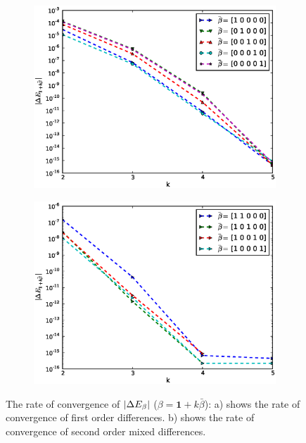 \documentclass[11pt]{article}
\begin{document}
	
	\begin{figure}[h!]
		\centering
		\begin{subfigure}{.5\textwidth}
			\centering
			\includegraphics[width=1\linewidth]{./figures/first_difference_basket.eps}
			\caption{}
			\label{fig:sub1}
		\end{subfigure}%
		\begin{subfigure}{.5\textwidth}
			\centering
			\includegraphics[width=1\linewidth]{./figures/mixed_difference_order2_basket_1.eps}
			\caption{}
			\label{fig:sub2}
		\end{subfigure}%
		\caption{The rate of convergence of $\left\lvert\Delta E_{\beta}\right\rvert$ ($\beta=\mathbf{1}+k \bar{\beta}$): a) shows the rate of convergence of first order differences. b)  shows the rate of convergence of second order mixed differences.}
			\label{fig:test_basket_1}
	\end{figure}
\end{document}
